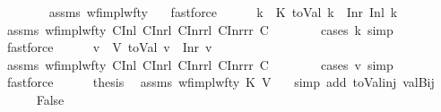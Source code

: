\begin{isabellebody}
\ \ \ \ \ \ \isamarkupfalse%
\ assms\ wf{\isacharunderscore}{\kern0pt}impl{\isacharunderscore}{\kern0pt}wf{\isacharunderscore}{\kern0pt}ty\ {\isachardoublequoteopen}{}{\isachardoublequoteclose}\ \isamarkupfalse%
\ fastforce\isanewline
\ \ \ \ \isamarkupfalse%
\ k{\isacharprime}{\kern0pt}\ \ K{\isacharcolon}{\kern0pt}\ {\isachardoublequoteopen}toVal{}{}{}{}\ k\ {\isacharequal}{\kern0pt}\ Inr\ {\isacharparenleft}{\kern0pt}Inl\ k{\isacharprime}{\kern0pt}{\isacharparenright}{\kern0pt}{\isachardoublequoteclose}\isanewline
\ \ \ \ \ \ \isamarkupfalse%
\ assms\ wf{\isacharunderscore}{\kern0pt}impl{\isacharunderscore}{\kern0pt}wf{\isacharunderscore}{\kern0pt}ty\ C{}Inl\ C{}Inrl\ C{}Inrrl\ C{}Inrrr\ C\isanewline
\ \ \ \ \ \ \isamarkupfalse%
\ {\isacharparenleft}{\kern0pt}cases\ k{\isacharsemicolon}{\kern0pt}\ simp{\isacharparenright}{\kern0pt}\ \isamarkupfalse%
\ fastforce\isanewline
\ \ \ \ \isamarkupfalse%
\ v{\isacharprime}{\kern0pt}\ \ V{\isacharcolon}{\kern0pt}\ {\isachardoublequoteopen}toVal{}{}{}{}\ v\ {\isacharequal}{\kern0pt}\ Inr\ v{\isacharprime}{\kern0pt}{\isachardoublequoteclose}\isanewline
\ \ \ \ \ \ \isamarkupfalse%
\ assms\ wf{\isacharunderscore}{\kern0pt}impl{\isacharunderscore}{\kern0pt}wf{\isacharunderscore}{\kern0pt}ty\ C{}Inl\ C{}Inrl\ C{}Inrrl\ C{}Inrrr\ C\isanewline
\ \ \ \ \ \ \isamarkupfalse%
\ {\isacharparenleft}{\kern0pt}cases\ v{\isacharsemicolon}{\kern0pt}\ simp{\isacharparenright}{\kern0pt}\ \isamarkupfalse%
\ fastforce\isanewline
\ \ \ \ \isamarkupfalse%
\ {\isacharquery}{\kern0pt}thesis\ \isamarkupfalse%
\ assms\ wf{\isacharunderscore}{\kern0pt}impl{\isacharunderscore}{\kern0pt}wf{\isacharunderscore}{\kern0pt}ty\ K\ V\ {\isachardoublequoteopen}{}{\isachardoublequoteclose}\ \isamarkupfalse%
\ {\isacharparenleft}{\kern0pt}simp\ add{\isacharcolon}{\kern0pt}\ toVal{}{}{}{}{\isacharunderscore}{\kern0pt}inj\ valBij{\isacharparenright}{\kern0pt}\isanewline
\ \ \isamarkupfalse%
\isanewline
\ \ \ \ \isamarkupfalse%
\ False\isanewline
\ \ \ \ \isamarkupfalse%

\end{isabellebody}
